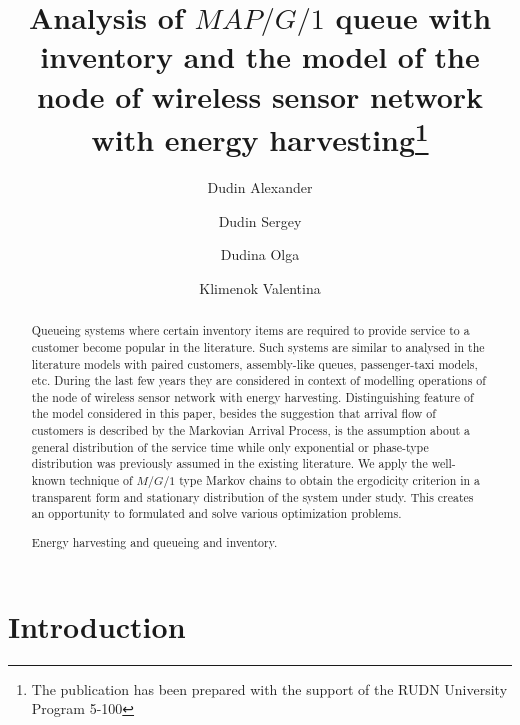 \documentclass[runningheads]{llncs}
\begin{document}
%
\title{Analysis of $MAP/G/1$ queue with inventory and the model of the node of wireless sensor network with energy harvesting\thanks{The publication has been prepared with the support  of the  RUDN University Program 5-100}}
%
%
\author{Dudin Alexander \and
Dudin Sergey  \and
Dudina Olga \and
Klimenok Valentina}
%
%
%
\maketitle              %
%
\begin{abstract}
Queueing systems where certain inventory items are required to provide service to a customer become popular in the literature. Such systems are similar to analysed in the literature models with paired customers, assembly-like queues, passenger-taxi models, etc. During the last few years they are considered in context of  modelling operations of the node of wireless sensor network with energy harvesting.  Distinguishing feature of the model considered in this paper, besides the suggestion that arrival flow of customers is described by the Markovian Arrival Process,  is the assumption about a general distribution of the service time while only exponential or phase-type distribution was previously assumed in the existing literature. We apply the well-known technique of $M/G/1$ type Markov chains to obtain the ergodicity criterion in a transparent form  and stationary distribution of the system under study. This creates an opportunity to formulated and solve various optimization problems.


{Energy harvesting  and queueing and inventory.}
\end{abstract}
%
%
%
\section{Introduction}
\end{document}
